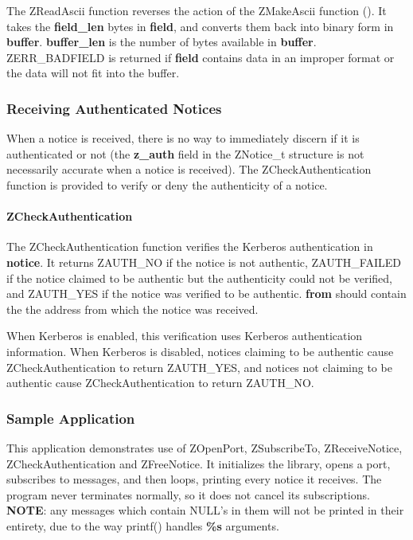 The ZReadAscii function reverses the action of the ZMakeAscii
function ().  It takes the {\bf field_len} bytes in
{\bf field}, and converts them back into binary form in {\bf buffer}.
{\bf buffer_len} is the number of bytes available in {\bf buffer}.
ZERR_BADFIELD is returned if {\bf field} contains data in an improper
format or the data will not fit into the buffer.

\subsubsection{Receiving Authenticated Notices}
\label{receiving-authenticated}

When a notice is received, there is no way to immediately discern if
it is authenticated or not (the {\bf z_auth} field in the ZNotice_t
structure is not necessarily accurate when a notice is received).  The
ZCheckAuthentication function is provided to verify or deny the
authenticity of a notice.

\paragraph{ZCheckAuthentication}
\label{ZCheckAuthentication}

\etemplate
{}

The ZCheckAuthentication function verifies the Kerberos authentication
in {\bf notice}.  It returns ZAUTH_NO if the notice is not authentic,
ZAUTH_FAILED if the notice claimed to be authentic but the authenticity
could not be verified, and ZAUTH_YES if the notice was verified to be
authentic. {\bf *from} should contain the the address from which the
notice was received.

When Kerberos is enabled, this verification uses Kerberos authentication
information.  When Kerberos is disabled, notices claiming to be
authentic cause ZCheckAuthentication to return ZAUTH_YES, and notices
not claiming to be authentic cause ZCheckAuthentication to return
ZAUTH_NO.

\subsubsection{Sample Application}

This application demonstrates use of ZOpenPort, ZSubscribeTo,
ZReceiveNotice, ZCheckAuthentication and ZFreeNotice.  It initializes
the library, opens a port, subscribes to messages, and then loops,
printing every notice it receives.  The program never terminates
normally, so it does not cancel its subscriptions.  {\bf NOTE}: any
messages which contain NULL's in them will not be printed in their
entirety, due to the way printf() handles {\bf \%s} arguments.

